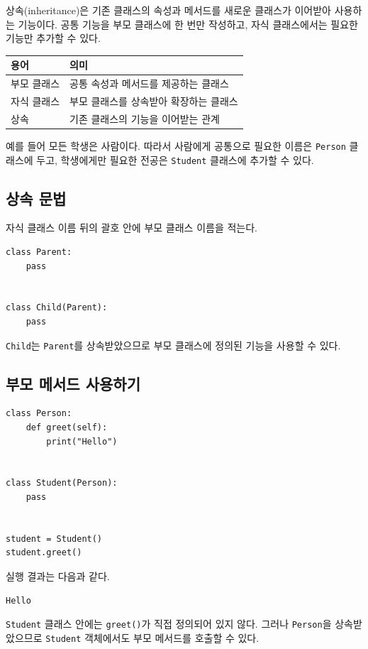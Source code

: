 \documentclass[11pt,a4paper]{article}
\begin{document}
상속(inheritance)은 기존 클래스의 속성과 메서드를 새로운 클래스가 이어받아 사용하는 기능이다. 공통 기능을 부모 클래스에 한 번만 작성하고, 자식 클래스에서는 필요한 기능만 추가할 수 있다.

\begin{center}
\begin{tabular}{ll}
\toprule
용어 & 의미 \\
\midrule
부모 클래스 & 공통 속성과 메서드를 제공하는 클래스 \\
자식 클래스 & 부모 클래스를 상속받아 확장하는 클래스 \\
상속 & 기존 클래스의 기능을 이어받는 관계 \\
\bottomrule
\end{tabular}
\end{center}

예를 들어 모든 학생은 사람이다. 따라서 사람에게 공통으로 필요한 이름은 \texttt{Person} 클래스에 두고, 학생에게만 필요한 전공은 \texttt{Student} 클래스에 추가할 수 있다.

\subsection{상속 문법}

자식 클래스 이름 뒤의 괄호 안에 부모 클래스 이름을 적는다.

\begin{lstlisting}
class Parent:
    pass


class Child(Parent):
    pass
\end{lstlisting}

\texttt{Child}는 \texttt{Parent}를 상속받았으므로 부모 클래스에 정의된 기능을 사용할 수 있다.

\subsection{부모 메서드 사용하기}

\begin{lstlisting}
class Person:
    def greet(self):
        print("Hello")


class Student(Person):
    pass


student = Student()
student.greet()
\end{lstlisting}

실행 결과는 다음과 같다.

\begin{verbatim}
Hello
\end{verbatim}

\texttt{Student} 클래스 안에는 \texttt{greet()}가 직접 정의되어 있지 않다. 그러나 \texttt{Person}을 상속받았으므로 \texttt{Student} 객체에서도 부모 메서드를 호출할 수 있다.
\end{document}
